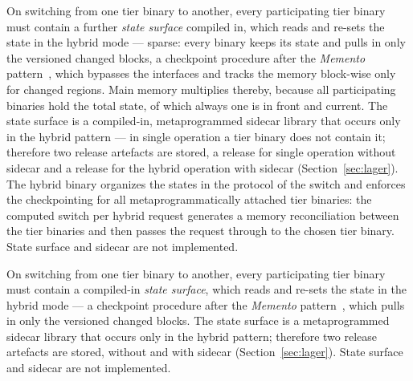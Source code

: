 \begin{nurlang}
On switching from one tier binary to another, every participating tier binary must contain a further
\emph{state surface} compiled in, which reads and re-sets the state in the hybrid mode ---
sparse: every binary keeps its state and pulls in only the versioned changed blocks, a
checkpoint procedure after the \emph{Memento} pattern~\cite{gamma1994patterns}, which bypasses the interfaces
and tracks the memory block-wise only for changed regions. Main memory multiplies
thereby, because all participating binaries hold the total state, of which always one is in front and current.
The state surface is a compiled-in, metaprogrammed sidecar library that occurs only in the
hybrid pattern --- in single operation a tier binary does not contain it; therefore two
release artefacts are stored, a release for single operation without sidecar and a release for the
hybrid operation with sidecar (Section~\ref{sec:lager}). The hybrid binary organizes the states in the
protocol of the switch and enforces the checkpointing for all metaprogrammatically attached tier binaries:
the computed switch per hybrid request generates a memory reconciliation between the
tier binaries and then passes the request through to the chosen tier binary. State surface and sidecar
are not implemented.
\end{nurlang}
\begin{nurkurz}
On switching from one tier binary to another, every participating tier binary must contain a
compiled-in \emph{state surface}, which reads and re-sets the state in the hybrid mode --- a checkpoint
procedure after the \emph{Memento} pattern~\cite{gamma1994patterns}, which pulls in only the versioned
changed blocks. The state surface is a metaprogrammed sidecar library that occurs only in the hybrid
pattern; therefore two release artefacts are stored, without and with sidecar
(Section~\ref{sec:lager}). State surface and sidecar are not implemented.
\end{nurkurz}

